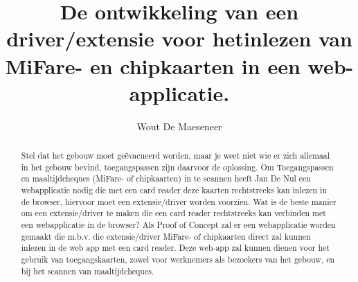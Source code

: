 \documentclass{hogent-article}
\title{De ontwikkeling van een driver/extensie voor hetinlezen van MiFare- en chipkaarten in een web-applicatie.}
\author{Wout De Maeseneer}
\begin{document}
    
    \begin{abstract}
        Stel dat het gebouw moet geëvacueerd worden, maar je weet niet wie er zich allemaal in het gebouw bevind, toegangspassen zijn daarvoor de oplossing. 
        Om Toegangspassen en maaltijdcheques (MiFare- of chipkaarten) in te scannen heeft Jan De Nul een webapplicatie nodig die met een card reader deze kaarten rechtstreeks kan inlezen in de browser, hiervoor moet een extensie/driver worden voorzien.
        Wat is de beste manier om een extensie/driver te maken die een card reader rechtstreeks kan verbinden met een webapplicatie in de browser? 
        Als Proof of Concept zal er een webapplicatie worden gemaakt die m.b.v. die extensie/driver MiFare- of chipkaarten direct zal kunnen inlezen in de web app met een card reader. Deze web-app zal kunnen dienen voor het gebruik van toegangskaarten, zowel voor werknemers als bezoekers van het gebouw, en bij het scannen van maaltijdcheques.
    \end{abstract}
    
    \tableofcontents
    
    
    
    \printbibliography[heading=bibintoc]
    
    
\end{document}

